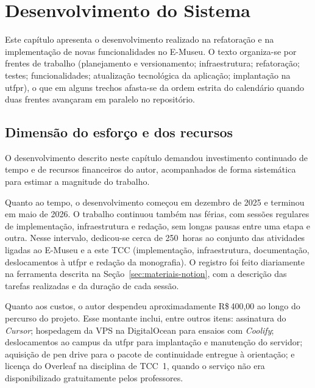 
\chapter{Desenvolvimento do Sistema}\label{cap:desenvolvimento}

Este capítulo apresenta o desenvolvimento realizado na refatoração e na implementação de novas funcionalidades no E-Museu. O texto organiza-se por frentes de trabalho (planejamento e versionamento; infraestrutura; refatoração; testes; funcionalidades; atualização tecnológica da aplicação; implantação na \acrshort{utfpr}), o que em alguns trechos afasta-se da ordem estrita do calendário quando duas frentes avançaram em paralelo no repositório.


\section{Dimensão do esforço e dos recursos}\label{sec:dev-esforco}

O desenvolvimento descrito neste capítulo demandou investimento continuado de tempo e de recursos financeiros do autor, acompanhados de forma sistemática para estimar a magnitude do trabalho.

Quanto ao tempo, o desenvolvimento começou em dezembro de 2025 e terminou em maio de 2026. O trabalho continuou também nas férias, com sessões regulares de implementação, infraestrutura e redação, sem longas pausas entre uma etapa e outra. Nesse intervalo, dedicou-se cerca de 250~horas ao conjunto das atividades ligadas ao E-Museu e a este TCC (implementação, infraestrutura, documentação, deslocamentos à \acrshort{utfpr} e redação da monografia). O registro foi feito diariamente na ferramenta descrita na Seção~\ref{sec:materiais-notion}, com a descrição das tarefas realizadas e da duração de cada sessão.

Quanto aos custos, o autor despendeu aproximadamente R\$\,400,00 ao longo do percurso do projeto. Esse montante inclui, entre outros itens: assinatura do \textit{Cursor}; hospedagem da VPS na DigitalOcean para ensaios com \textit{Coolify}; deslocamentos ao campus da \acrshort{utfpr} para implantação e manutenção do servidor; aquisição de pen drive para o pacote de continuidade entregue à orientação; e licença do Overleaf na disciplina de TCC~1, quando o serviço não era disponibilizado gratuitamente pelos professores.


